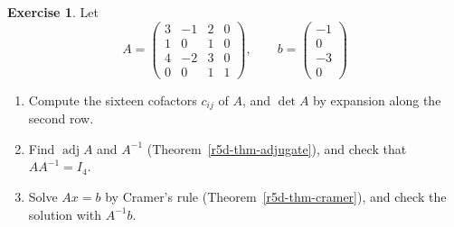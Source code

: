 \documentclass[12pt]{article}
\theoremstyle{definition}
\newtheorem{exercise}{Exercise}
\begin{document}
\begin{exercise}\label{r5d-dr-adjugate-cramer}
Let
\[
A=\begin{pmatrix}3&-1&2&0\\1&0&1&0\\4&-2&3&0\\0&0&1&1\end{pmatrix},\qquad b=\begin{pmatrix}-1\\0\\-3\\0\end{pmatrix}
\]
\begin{enumerate}
\item Compute the sixteen cofactors \(c_{ij}\) of \(A\), and \(\det A\) by expansion along the second row.
\item Find \(\operatorname{adj}A\) and \(A^{-1}\) (Theorem~\ref{r5d-thm-adjugate}), and check that \(AA^{-1}=I_4\).
\item Solve \(Ax=b\) by Cramer's rule (Theorem~\ref{r5d-thm-cramer}), and check the solution with \(A^{-1}b\).
\end{enumerate}
\end{exercise}
\end{document}
